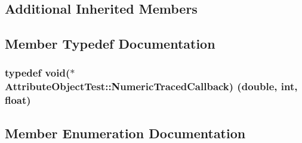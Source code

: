 \subsection*{Additional Inherited Members}


\subsection{Member Typedef Documentation}
\subsubsection[{\texorpdfstring{Numeric\+Traced\+Callback}{NumericTracedCallback}}]{\setlength{\rightskip}{0pt plus 5cm}typedef void($\ast$  Attribute\+Object\+Test\+::\+Numeric\+Traced\+Callback) (double, int, float)\hspace{0.3cm}{\ttfamily [private]}}\hypertarget{classAttributeObjectTest_a95819796ba72d4f8991c34a0eed7dc6f}{}\label{classAttributeObjectTest_a95819796ba72d4f8991c34a0eed7dc6f}


\subsection{Member Enumeration Documentation}

